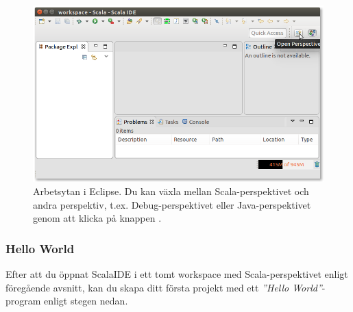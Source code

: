 \begin{figure}
\centering
\includegraphics[width=1.0\textwidth]{../img/eclipse/eclipse-scala-perspective.png}
\caption{Arbetsytan i Eclipse. Du kan växla mellan Scala-perspektivet och andra perspektiv, t.ex. Debug-perspektivet eller Java-perspektivet genom att klicka på knappen .}
\label{fig:appendix:eclipse:open-perspective}
\end{figure}

\subsubsection{Hello World}\label{subsubsection:eclipse:hello-world}

Efter att du öppnat ScalaIDE i ett tomt workspace med Scala-perspektivet enligt föregående avsnitt, kan du skapa ditt första projekt med ett \textit{''Hello World''}-program enligt stegen nedan.

